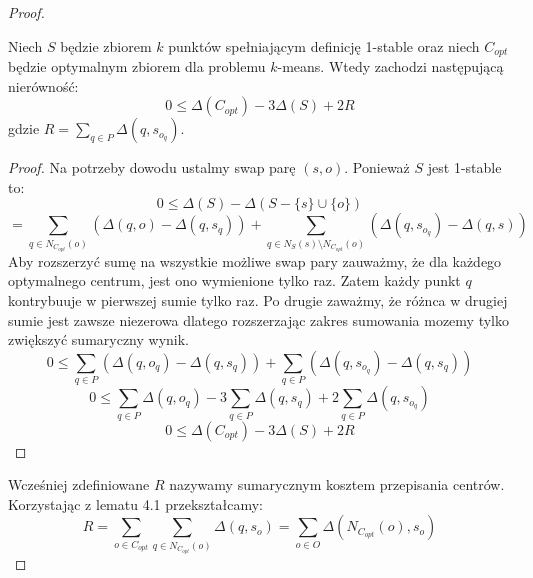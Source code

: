 \begin{proof}
    \begin{lemma}{\cite{10.1145/1007352.1007400}}
        Niech $S$ będzie zbiorem $k$ punktów spełniającym definicję 1-stable oraz niech $C_{opt}$ będzie optymalnym zbiorem dla problemu $k$-means.        Wtedy zachodzi następującą nierówność:
        \begin{equation}
            0 \leq \Delta(C_{opt}) - 3\Delta(S) + 2R
        \end{equation}
        gdzie $R = \sum_{q \in P} \Delta(q, s_{o_{q}})$.
    \end{lemma}
    \begin{proof}
        Na potrzeby dowodu ustalmy swap parę $(s, o)$.
        Ponieważ $S$ jest 1-stable to:
        \begin{equation}
           0 \leq \Delta(S) -  \Delta(S - \{s\} \cup \{o\})
        \end{equation}
        \begin{equation}
            = \sum_{q \in N_{C_{opt}}(o)} (\Delta(q, o) - \Delta(q, s_{q})) + \sum_{q \in N_{S}(s) \setminus N_{C_{opt}}(o)} (\Delta(q, s_{o_{q}}) - \Delta(q, s))
        \end{equation}
        Aby rozszerzyć sumę na wszystkie możliwe swap pary zauważmy, że dla każdego optymalnego centrum, jest ono wymienione tylko raz.
        Zatem każdy punkt $q$ kontrybuuje w pierwszej sumie tylko raz.
        Po drugie zaważmy, że różnca w drugiej sumie jest zawsze niezerowa dlatego rozszerzając zakres sumowania mozemy tylko zwiększyć sumaryczny wynik.
        \begin{equation}
            0 \leq \sum_{q \in P} (\Delta(q, o_{q}) - \Delta(q, s_{q})) + \sum_{q \in P} (\Delta(q, s_{o_{q}}) - \Delta(q, s_{q}))
        \end{equation}
        \begin{equation}
            0 \leq \sum_{q \in P} \Delta(q, o_{q}) - 3 \sum_{q \in P} \Delta(q, s_{q}) + 2\sum_{q \in P} \Delta(q, s_{o_{q}})
        \end{equation}
        \begin{equation}
            0 \leq \Delta(C_{opt}) - 3 \Delta(S) + 2R
        \end{equation}
    \end{proof}
    \noindent
    Wcześniej zdefiniowane $R$ nazywamy sumarycznym kosztem przepisania centrów.
    Korzystając z lematu 4.1 przekształcamy:
    \begin{equation}
        R = \sum_{o \in C_{opt}} \sum_{q \in N_{C_{opt}}(o)} \Delta(q, s_{o}) = \sum_{o \in O} \Delta(N_{C_{opt}}(o), s_{o}) 

\end{equation}
\end{proof}
